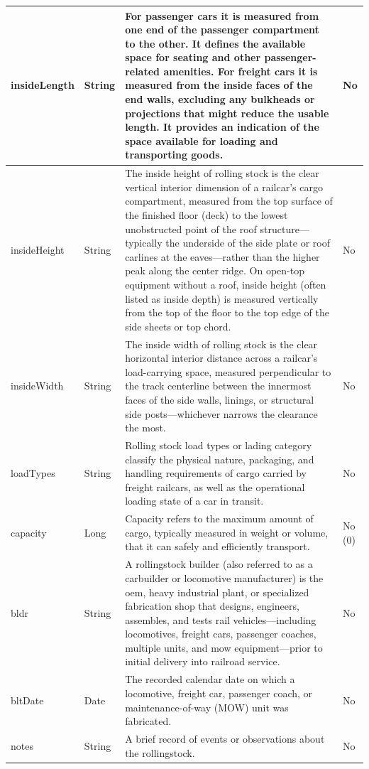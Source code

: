 \begin{longtable}{|L{3cm}|L{1.7cm}|L{9.1cm}|L{1.0cm}|}
	insideLength & String & For passenger cars it is measured from one end of the passenger compartment to the other. It defines the available space for seating and other passenger-related amenities. For freight cars it is measured from the inside faces of the end walls, excluding any bulkheads or projections that might reduce the usable length. It provides an indication of the space available for loading and transporting goods. & No \\ \hline
	insideHeight & String & The inside height of rolling stock is the clear vertical interior dimension of a railcar's cargo compartment, measured from the top surface of the finished floor (deck) to the lowest unobstructed point of the roof structure—typically the underside of the side plate or roof carlines at the eaves—rather than the higher peak along the center ridge. On open-top equipment without a roof, inside height (often listed as inside depth) is measured vertically from the top of the floor to the top edge of the side sheets or top chord. & No \\ \hline
	insideWidth & String & The inside width of rolling stock is the clear horizontal interior distance across a railcar's load-carrying space, measured perpendicular to the track centerline between the innermost faces of the side walls, linings, or structural side posts—whichever narrows the clearance the most. & No \\ \hline
	loadTypes & String & Rolling stock load types or lading category classify the physical nature, packaging, and handling requirements of cargo carried by freight railcars, as well as the operational loading state of a car in transit. & No \\ \hline
	capacity & Long & Capacity refers to the maximum amount of cargo, typically measured in weight or volume, that it can safely and efficiently transport. & No (0)\\ \hline
	bldr & String & A rollingstock builder (also referred to as a carbuilder or locomotive manufacturer) is the \gls{oem}, heavy industrial plant, or specialized fabrication shop that designs, engineers, assembles, and tests rail vehicles—including locomotives, freight cars, passenger coaches, multiple units, and \gls{mow} equipment—prior to initial delivery into railroad service. & No \\ \hline
	bltDate & Date & The recorded calendar date on which a locomotive, freight car, passenger coach, or maintenance-of-way (MOW) unit was fabricated. & No \\ \hline
	notes & String & A brief record of events or observations about the rollingstock. & No \\ \hline

\end{longtable}
